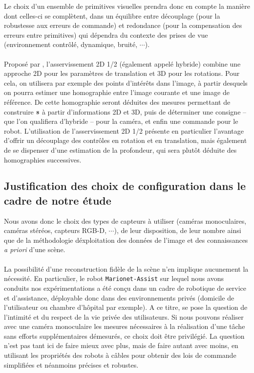 Le choix d'un ensemble de primitives visuelles prendra donc en compte la 
mani\`ere dont celles-ci se compl\`etent, dans un \'equilibre entre 
d\'ecouplage (pour la robustesse aux erreurs de commande) et redondance (pour 
la compensation des erreurs entre primitives) qui d\'ependra du contexte des 
prises de vue (environnement contr\^ol\'e, dynamique, bruit\'e, $\cdots$).\\

\\

Propos\'e par \cite{malis1999}, l'asservissement 2D 1/2 (\'egalement appel\'e 
hybride) combine une approche 2D pour les param\`etres de translation et 3D 
pour les rotations. Pour cela, on utilisera par exemple des points 
d'int\'er\^ets dans l'image, \`a partir desquels on pourra estimer une 
homographie entre l'image courante et une image de r\'ef\'erence. De cette 
homographie seront d\'eduites des mesures permettant de construire ${\bf s}$ \` 
a partir d'informations 2D et 3D, puis de d\'eterminer une consigne -- que 
l'on qualifiera d'hybride -- pour la cam\'era, et enfin une commande pour le 
robot. L'utilisation de l'asservissement 2D 1/2 pr\'esente en particulier 
l'avantage d'offrir un d\'ecouplage des contr\^oles en rotation et en 
translation, mais \'egalement de se dispenser d'une estimation de la profondeur, 
qui sera plut\^ot d\'eduite des homographies successives.


\subsection{Justification des choix de configuration dans le cadre de notre 
\'etude} \label{chap1-1-2}

Nous avons donc le choix des types de capteurs \`a utiliser (cam\'eras 
monoculaires, cam\'eras st\'er\'eos, capteurs RGB-D, $\cdots$), de leur 
disposition, de leur nombre ainsi que de la m\'ethodologie d\'exploitation des 
donn\'ees de l'image et des connaissances {\it a priori} d'une sc\`ene. \\

\\

La possibilit\'e d'une reconstruction fid\`ele de la sc\`ene n'en implique 
aucunement la n\'ecessit\'e. En particulier, le robot {\tt Marionet-Assist} sur 
lequel nous avons conduits nos exp\'erimentations a \'et\'e con\c cu dans un 
cadre de robotique de service et d'assistance, d\'eployable donc dans des 
environnements priv\'es (domicile de l'utilisateur ou chambre d'h\^opital par 
exemple). A ce titre, se pose la question de l'intimit\'e et du respect de la 
vie priv\'ee des utilisateurs. Si nous pouvons r\'ealiser avec une cam\'era 
monoculaire les mesures n\'ecessaires \`a la r\'ealisation d'une t\^ache sans 
efforts suppl\'ementaires d\'emesur\'es, ce choix doit \^etre privil\'egi\'e. 
La question n'est pas tant ici de faire mieux avec plus, mais de faire autant 
avec moins, en utilisant les propri\'et\'es des robots \`a c\^ables pour 
obtenir des lois de commande simplifi\'ees et n\'eanmoins pr\'ecises et 
robustes.\\

